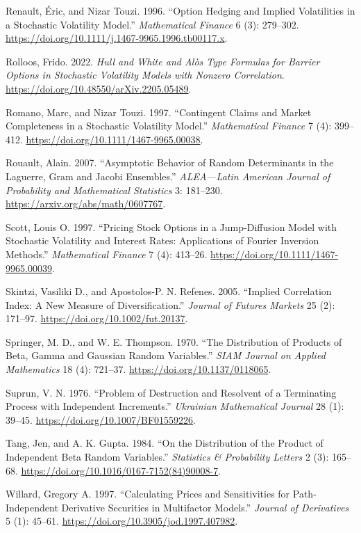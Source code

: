 \documentclass[
  english,
  11pt,
  letterpaper,
  DIV=11,
  numbers=noendperiod]{scrartcl}
\newlength{\cslhangindent}
\newenvironment{CSLReferences}[2] %
 {\begin{list}{}{%
  \setlength{\itemindent}{0pt}
  \setlength{\leftmargin}{0pt}
  \setlength{\parsep}{0pt}
  \ifodd #1
   \setlength{\leftmargin}{\cslhangindent}
   \setlength{\itemindent}{-1\cslhangindent}
  \fi
  \setlength{\itemsep}{#2\baselineskip}}}
 {\end{list}}
\theoremstyle{plain}
\theoremstyle{plain}
\theoremstyle{plain}
\theoremstyle{plain}
\theoremstyle{remark}
\begin{document}
\begin{CSLReferences}{1}{1}
Renault, Éric, and Nizar Touzi. 1996. {``Option Hedging and Implied
Volatilities in a Stochastic Volatility Model.''} \emph{Mathematical
Finance} 6 (3): 279--302.
\url{https://doi.org/10.1111/j.1467-9965.1996.tb00117.x}.

Rolloos, Frido. 2022. \emph{{Hull and White} and {Al{ò}s} Type Formulas
for Barrier Options in Stochastic Volatility Models with Nonzero
Correlation}. \url{https://doi.org/10.48550/arXiv.2205.05489}.

Romano, Marc, and Nizar Touzi. 1997. {``Contingent Claims and Market
Completeness in a Stochastic Volatility Model.''} \emph{Mathematical
Finance} 7 (4): 399--412. \url{https://doi.org/10.1111/1467-9965.00038}.

Rouault, Alain. 2007. {``Asymptotic Behavior of Random Determinants in
the Laguerre, Gram and Jacobi Ensembles.''} \emph{ALEA---Latin American
Journal of Probability and Mathematical Statistics} 3: 181--230.
\url{https://arxiv.org/abs/math/0607767}.

Scott, Louis O. 1997. {``Pricing Stock Options in a Jump-Diffusion Model
with Stochastic Volatility and Interest Rates: Applications of Fourier
Inversion Methods.''} \emph{Mathematical Finance} 7 (4): 413--26.
\url{https://doi.org/10.1111/1467-9965.00039}.

Skintzi, Vasiliki D., and Apostolos-P. N. Refenes. 2005. {``Implied
Correlation Index: A New Measure of Diversification.''} \emph{Journal of
Futures Markets} 25 (2): 171--97.
\url{https://doi.org/10.1002/fut.20137}.

Springer, M. D., and W. E. Thompson. 1970. {``The Distribution of
Products of Beta, Gamma and Gaussian Random Variables.''} \emph{SIAM
Journal on Applied Mathematics} 18 (4): 721--37.
\url{https://doi.org/10.1137/0118065}.

Suprun, V. N. 1976. {``Problem of Destruction and Resolvent of a
Terminating Process with Independent Increments.''} \emph{Ukrainian
Mathematical Journal} 28 (1): 39--45.
\url{https://doi.org/10.1007/BF01559226}.

Tang, Jen, and A. K. Gupta. 1984. {``On the Distribution of the Product
of Independent Beta Random Variables.''} \emph{Statistics \& Probability
Letters} 2 (3): 165--68.
\url{https://doi.org/10.1016/0167-7152(84)90008-7}.

Willard, Gregory A. 1997. {``Calculating Prices and Sensitivities for
Path-Independent Derivative Securities in Multifactor Models.''}
\emph{Journal of Derivatives} 5 (1): 45--61.
\url{https://doi.org/10.3905/jod.1997.407982}.

\end{CSLReferences}
\end{document}
